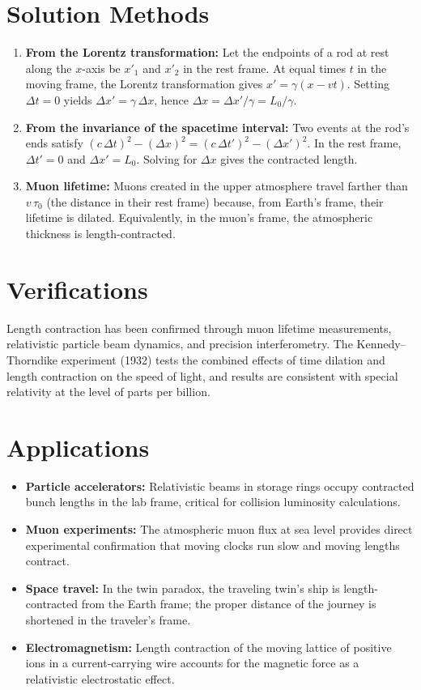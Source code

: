 \section*{Solution Methods}

\begin{enumerate}
  \item \textbf{From the Lorentz transformation:} Let the endpoints of a rod at rest along the $x$-axis be $x'_{1}$ and $x'_{2}$ in the rest frame. At equal times $t$ in the moving frame, the Lorentz transformation gives $x' = \gamma(x - vt)$. Setting $\Delta t = 0$ yields $\Delta x' = \gamma\,\Delta x$, hence $\Delta x = \Delta x'/\gamma = L_{0}/\gamma$.
  \item \textbf{From the invariance of the spacetime interval:} Two events at the rod's ends satisfy $(c\,\Delta t)^{2} - (\Delta x)^{2} = (c\,\Delta t')^{2} - (\Delta x')^{2}$. In the rest frame, $\Delta t' = 0$ and $\Delta x' = L_{0}$. Solving for $\Delta x$ gives the contracted length.
  \item \textbf{Muon lifetime:} Muons created in the upper atmosphere travel farther than $v\,\tau_{0}$ (the distance in their rest frame) because, from Earth's frame, their lifetime is dilated. Equivalently, in the muon's frame, the atmospheric thickness is length-contracted.
\end{enumerate}
\section*{Verifications}

Length contraction has been confirmed through muon lifetime measurements, relativistic particle beam dynamics, and precision interferometry. The Kennedy--Thorndike experiment (1932) tests the combined effects of time dilation and length contraction on the speed of light, and results are consistent with special relativity at the level of parts per billion.
\section*{Applications}

\begin{itemize}
  \item \textbf{Particle accelerators:} Relativistic beams in storage rings occupy contracted bunch lengths in the lab frame, critical for collision luminosity calculations.
  \item \textbf{Muon experiments:} The atmospheric muon flux at sea level provides direct experimental confirmation that moving clocks run slow and moving lengths contract.
  \item \textbf{Space travel:} In the twin paradox, the traveling twin's ship is length-contracted from the Earth frame; the proper distance of the journey is shortened in the traveler's frame.
  \item \textbf{Electromagnetism:} Length contraction of the moving lattice of positive ions in a current-carrying wire accounts for the magnetic force as a relativistic electrostatic effect.
\end{itemize}
